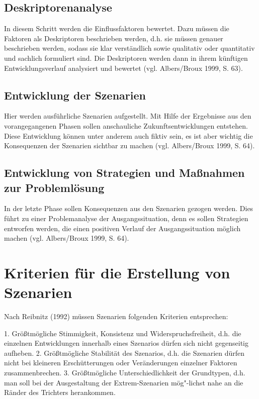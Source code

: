 \documentclass[12pt,a4paper]{article}
\begin{document}
\subsection{Deskriptorenanalyse} 
In diesem Schritt werden die Einflussfaktoren bewertet. Dazu müssen die Faktoren als Deskriptoren beschrieben werden, d.h. sie müssen genauer beschrieben werden, sodass sie klar verständlich sowie qualitativ oder quantitativ und sachlich formuliert sind. Die Deskriptoren werden dann in ihrem künftigen Entwicklungsverlauf analysiert und bewertet (vgl. Albers/Broux 1999, S. 63). 

\subsection{Entwicklung der Szenarien} 
Hier werden ausführliche Szenarien aufgestellt. Mit Hilfe der Ergebnisse aus den vorangegangenen Phasen sollen anschauliche Zukunftsentwicklungen entstehen. Diese Entwicklung können unter anderem auch fiktiv sein, es ist aber wichtig die Konsequenzen der Szenarien sichtbar zu machen (vgl. Albers/Broux 1999, S. 64). 

\subsection{Entwicklung von Strategien und Maßnahmen zur Problemlösung} 
In der letzte Phase sollen Konsequenzen aus den Szenarien gezogen werden. Dies führt zu einer Problemanalyse der Ausgangssituation, denn es sollen Strategien entworfen werden, die einen positiven Verlauf der Ausgangssituation möglich machen (vgl. Albers/Broux 1999, S. 64). 

\section{Kriterien für die Erstellung von Szenarien} 
Nach Reibnitz (1992)\cite{Reibnitz1992} müssen Szenarien folgenden Kriterien entsprechen: 

1. Größtmögliche Stimmigkeit, Konsistenz und Widerspruchsfreiheit, d.h. die einzelnen Entwicklungen innerhalb eines Szenarios dürfen sich nicht gegenseitig aufheben. 
2. Größtmögliche Stabilität des Szenarios, d.h. die Szenarien dürfen nicht bei kleineren Erschütterungen oder Veränderungen einzelner Faktoren zusammenbrechen. 
3. Größtmögliche Unterschiedlichkeit der Grundtypen, d.h. man soll bei der Ausgestaltung der Extrem-Szenarien mög"-lichst nahe an die Ränder des Trichters herankommen.
\end{document}
